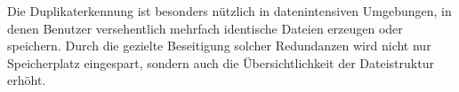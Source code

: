 Die Duplikaterkennung ist besonders nützlich in datenintensiven Umgebungen, in denen Benutzer versehentlich mehrfach identische Dateien erzeugen oder speichern. Durch die gezielte Beseitigung solcher Redundanzen wird nicht nur Speicherplatz eingespart, sondern auch die Übersichtlichkeit der Dateistruktur erhöht.
